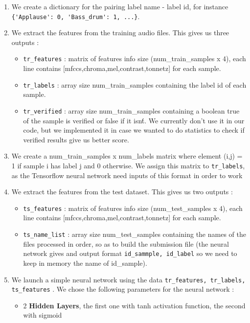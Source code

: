 \documentclass{article} %
\begin{document}
			\begin{enumerate}
				\item We create a dictionary for the pairing label name - label id, for instance \verb+{'Applause': 0, 'Bass_drum': 1, ...}+.
				\item We extract the features from the training audio files. This gives us three outputs :
					\begin{itemize}
						\item \verb+tr_features+ : matrix of features info size (num\_train\_samples x 4), each line contains [mfccs,chroma,mel,contrast,tonnetz] for each sample.
						\item \verb+tr_labels+ : array size num\_train\_samples containing the label id of each sample.
						\item \verb+tr_verified+ : array size num\_train\_samples containing a boolean true of the sample is verified or false if it isn\'t. We currently don't use it in our code, but we implemented it in case we wanted to do statistics to check if verified results give us better score.
					\end{itemize}
				\item We create a num\_train\_samples x num\_labels matrix where element (i,j) = 1 if sample i has label j and 0 otherwise. We assign this matrix to \verb+tr_labels+, as the Tensorflow neural network need inputs of this format in order to work
				\item We extract the features from the test dataset. This gives us two outputs :
					\begin{itemize}
						\item \verb+ts_features+ : matrix of features info size (num\_test\_samples x 4), each line contains [mfccs,chroma,mel,contrast,tonnetz] for each sample.
						\item \verb+ts_name_list+ : array size num\_test\_samples containing the names of the files processed in order, so as to build the submission file (the neural network gives and output format \verb+id_sammple, id_label+ so we need to keep in memory the name of id\_sample).
					\end{itemize}
				\item We launch a simple neural network using the data \verb+tr_features, tr_labels, ts_features+ . We chose the following parameters for the neural network :
					\begin{itemize}
						\item 2 \textbf{Hidden Layers}, the first one with tanh activation function, the second with sigmoid

\end{itemize}
\end{enumerate}
\end{document}
